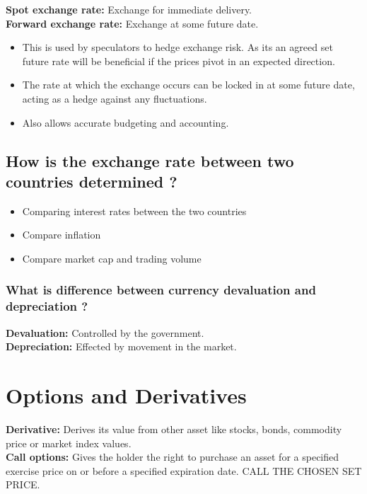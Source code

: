 \documentclass[11pt]{scrartcl} %
\begin{document}
\textbf{Spot exchange rate:} Exchange for immediate delivery. \\
\textbf{Forward exchange rate:} Exchange at some future date.

\begin{itemize}
	\item This is used by speculators to hedge exchange risk. As its an agreed set future rate will be beneficial if the prices pivot in an expected direction.
	\item The rate at which the exchange occurs can be locked in at some future date, acting as a hedge against any fluctuations.
	\item Also allows accurate budgeting and accounting.
\end{itemize}

\subsection{How is the exchange rate between two countries determined ?}

\begin{itemize}
	\item Comparing interest rates between the two countries
	\item Compare inflation
	\item Compare market cap and trading volume
\end{itemize}

\subsubsection{What is difference between currency devaluation and depreciation ?}

\textbf{Devaluation:} Controlled by the government.\\
\textbf{Depreciation:} Effected by movement in the market.

\section{Options and Derivatives}

\textbf{Derivative:} Derives its value from other asset like stocks, bonds, commodity price or market index values.\\
\textbf{Call options:} Gives the holder the right to purchase an asset for a specified exercise price on or before a specified expiration date. CALL THE CHOSEN SET PRICE.\\
\end{document}
